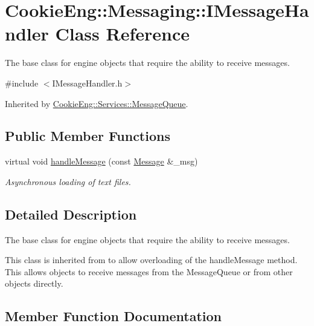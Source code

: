 \hypertarget{class_cookie_eng_1_1_messaging_1_1_i_message_handler}{}\section{Cookie\+Eng\+:\+:Messaging\+:\+:I\+Message\+Handler Class Reference}
\label{class_cookie_eng_1_1_messaging_1_1_i_message_handler}


The base class for engine objects that require the ability to receive messages.  




{\ttfamily \#include $<$I\+Message\+Handler.\+h$>$}



Inherited by \hyperlink{class_cookie_eng_1_1_services_1_1_message_queue}{Cookie\+Eng\+::\+Services\+::\+Message\+Queue}.

\subsection*{Public Member Functions}
\begin{DoxyCompactItemize}
\item 
virtual void \hyperlink{class_cookie_eng_1_1_messaging_1_1_i_message_handler_a4da863b449970f8195d3c60c83c6d183}{handle\+Message} (const \hyperlink{class_cookie_eng_1_1_messaging_1_1_message}{Message} \&\+\_\+msg)
\begin{DoxyCompactList}\small\item\em Asynchronous loading of text files. \end{DoxyCompactList}\end{DoxyCompactItemize}


\subsection{Detailed Description}
The base class for engine objects that require the ability to receive messages. 

This class is inherited from to allow overloading of the handle\+Message method. This allows objects to receive messages from the Message\+Queue or from other objects directly. 

\subsection{Member Function Documentation}
\mbox{\label{class_cookie_eng_1_1_messaging_1_1_i_message_handler_a4da863b449970f8195d3c60c83c6d183}} 

